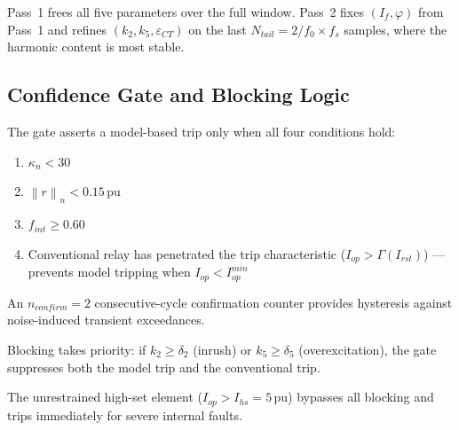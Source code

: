 \documentclass[12pt,a4paper]{article}
\newcommand{\norm}[1]{\left\lVert#1\right\rVert}
\newcommand{\kappan}{\kappa_n}
\newcommand{\Iop}{I_{op}}
\newcommand{\Irst}{I_{rst}}
\begin{document}
Pass~1 frees all five parameters over the full window.  Pass~2 fixes
$(I_f, \varphi)$ from Pass~1 and refines $(k_2, k_5, \varepsilon_{CT})$
on the last $N_{tail} = 2/f_0 \times f_s$ samples, where the harmonic
content is most stable.

\subsection{Confidence Gate and Blocking Logic}
\label{sec:87T_gate}

The gate asserts a model-based trip only when all four conditions hold:
\begin{enumerate}
  \item $\kappan < 30$
  \item $\norm{r}_n < 0.15$\,pu
  \item $f_{int} \geq 0.60$
  \item Conventional relay has penetrated the trip characteristic
        ($\Iop > \Gamma(\Irst)$) --- prevents model tripping when
        $\Iop < \Iop^{min}$
\end{enumerate}
An $n_{confirm} = 2$ consecutive-cycle confirmation counter provides
hysteresis against noise-induced transient exceedances.

Blocking takes priority: if $k_2 \geq \delta_2$ (inrush) or
$k_5 \geq \delta_5$ (overexcitation), the gate suppresses both the
model trip and the conventional trip.

The unrestrained high-set element ($\Iop > I_{hs} = 5$\,pu) bypasses all
blocking and trips immediately for severe internal faults.
\end{document}
